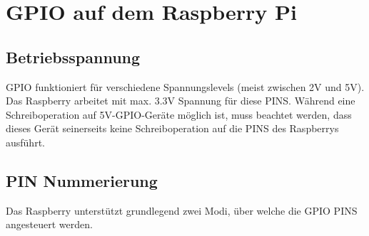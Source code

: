 \documentclass[a4paper,11pt]{article}
\begin{document}
\section*{GPIO auf dem Raspberry Pi}
\subsection*{Betriebsspannung}
GPIO funktioniert für verschiedene Spannungslevels (meist zwischen 2V und 5V). Das Raspberry arbeitet mit max. 3.3V Spannung für diese PINS. Während eine Schreiboperation auf 5V-GPIO-Geräte möglich ist, muss beachtet werden, dass dieses Gerät seinerseits keine Schreiboperation auf die PINS des Raspberrys ausführt.

\subsection*{PIN Nummerierung}
Das Raspberry unterstützt grundlegend zwei Modi, über welche die GPIO PINS angesteuert werden.
\end{document}
